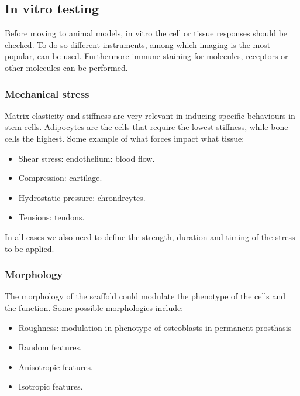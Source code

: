 	\subsection{In vitro testing}
	Before moving to animal models, in vitro the cell or tissue responses should be checked.
	To do so different instruments, among which imaging is the most popular, can be used.
	Furthermore immune staining for molecules, receptors or other molecules can be performed.

		\subsubsection{Mechanical stress}
		Matrix elasticity and stiffness are very relevant in inducing specific behaviours in stem cells.
		Adipocytes are the cells that require the lowest stiffness, while bone cells the highest.
		Some example of what forces impact what tissue:

		\begin{multicols}{2}
			\begin{itemize}
				\item Shear stress: endothelium: blood flow.
				\item Compression: cartilage.
				\item Hydrostatic pressure: chrondrcytes.
				\item Tensions: tendons.
			\end{itemize}
		\end{multicols}

		In all cases we also need to define the strength, duration and timing of the stress to be applied.

		\subsubsection{Morphology}
		The morphology of the scaffold could modulate the phenotype of the cells and the function.
		Some possible morphologies include:

		\begin{multicols}{2}
			\begin{itemize}
				\item Roughness: modulation in phenotype of osteoblasts in permanent prosthasis
				\item Random features.
				\item Anisotropic features.
				\item Isotropic features.
			\end{itemize}
		\end{multicols}

